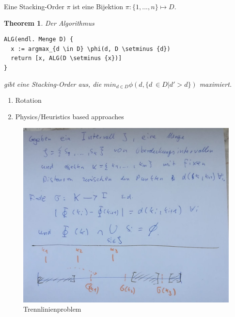\documentclass[a4paper,11pt]{article}
\newtheorem{theorem}{Theorem}
\theoremstyle{mytheor}
\begin{document}
Eine Stacking-Order $\pi$ ist eine Bijektion $\pi: \{1,...,n\} \mapsto D$.

\begin{theorem}
  
Der Algorithmus 

\begin{verbatim}
ALG(endl. Menge D) {
  x := argmax_{d \in D} \phi(d, D \setminus {d})
  return [x, ALG(D \setminus {x})]
}
\end{verbatim}

gibt eine Stacking-Order aus, die $min_{d \in D} \phi(d, \{d\ \in D | d' > d\})$ maximiert.
\end{theorem}


\begin{enumerate}
  \item Rotation
  \item Physics/Heuristics based approaches
\end{enumerate}

\begin{figure}[htp]
  \includegraphics[width=\textwidth,height=\textheight,keepaspectratio]{assets/trennlinienproblem.jpg}
  \caption{Trennlinienproblem}
\end{figure}
\end{document}
